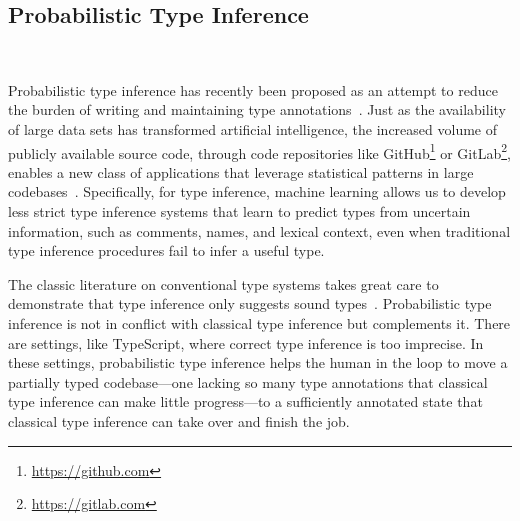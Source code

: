 \documentclass[acmsmall, review, anonymous]{acmart}\settopmatter{printfolios=true,printccs=false,printacmref=false}
\begin{document}
\subsection{Probabilistic Type Inference}~\label{}

Probabilistic type inference
has recently been proposed as an attempt to reduce the burden
of writing and maintaining type
annotations~\cite{wei20,raychev15,hellendoorn18}.
Just as the availability of large data sets has transformed artificial intelligence,
the increased volume of publicly available source code, through
code repositories like GitHub\footnote{\href{https://github.com}{https://github.com}}
or GitLab\footnote{\href{https://gitlab.com}{https://gitlab.com}},
enables a new class of applications that leverage statistical
patterns in large codebases~\cite{allamanis17}.
Specifically, for type inference, machine learning
allows us to develop less strict type inference systems
that learn to predict types from uncertain information,
such as comments, names, and lexical context,
even when traditional type inference procedures
fail to infer a useful type.

The classic literature on conventional type systems takes great care to demonstrate
that type inference only suggests sound types~\cite{DBLP:journals/jcss/Milner78,Pierce2002}.
Probabilistic type inference is not in conflict with classical type inference but complements it.
There are settings, like TypeScript, where correct type inference is too imprecise.
In these settings, probabilistic type inference helps the human in the loop to move a
partially typed codebase---one lacking so many type annotations that classical type inference
can make little progress---to a sufficiently annotated state that classical type inference can take over and finish the job.
\end{document}

